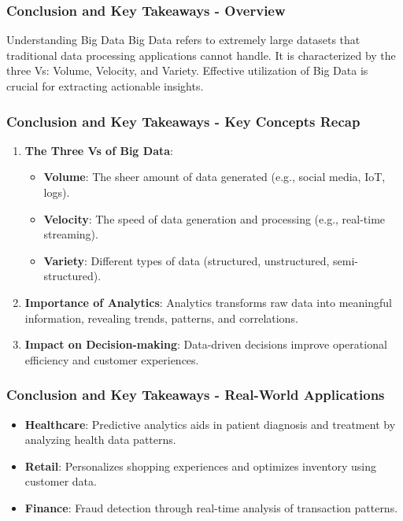 \documentclass[aspectratio=169]{beamer}
\begin{document}
\begin{frame}[fragile]
    \frametitle{Conclusion and Key Takeaways - Overview}
    \begin{block}{Understanding Big Data}
        Big Data refers to extremely large datasets that traditional data processing applications cannot handle. It is characterized by the three Vs: Volume, Velocity, and Variety. 
        Effective utilization of Big Data is crucial for extracting actionable insights.
    \end{block}
\end{frame}

\begin{frame}[fragile]
    \frametitle{Conclusion and Key Takeaways - Key Concepts Recap}
    \begin{enumerate}
        \item \textbf{The Three Vs of Big Data}:
        \begin{itemize}
            \item \textbf{Volume}: The sheer amount of data generated (e.g., social media, IoT, logs).
            \item \textbf{Velocity}: The speed of data generation and processing (e.g., real-time streaming).
            \item \textbf{Variety}: Different types of data (structured, unstructured, semi-structured).
        \end{itemize}
        
        \item \textbf{Importance of Analytics}: 
        Analytics transforms raw data into meaningful information, revealing trends, patterns, and correlations.

        \item \textbf{Impact on Decision-making}: 
        Data-driven decisions improve operational efficiency and customer experiences.
    \end{enumerate}
\end{frame}

\begin{frame}[fragile]
    \frametitle{Conclusion and Key Takeaways - Real-World Applications}
    \begin{itemize}
        \item \textbf{Healthcare}: 
        Predictive analytics aids in patient diagnosis and treatment by analyzing health data patterns.

        \item \textbf{Retail}: 
        Personalizes shopping experiences and optimizes inventory using customer data.

        \item \textbf{Finance}: 
        Fraud detection through real-time analysis of transaction patterns.
    \end{itemize}
\end{frame}
\end{document}
